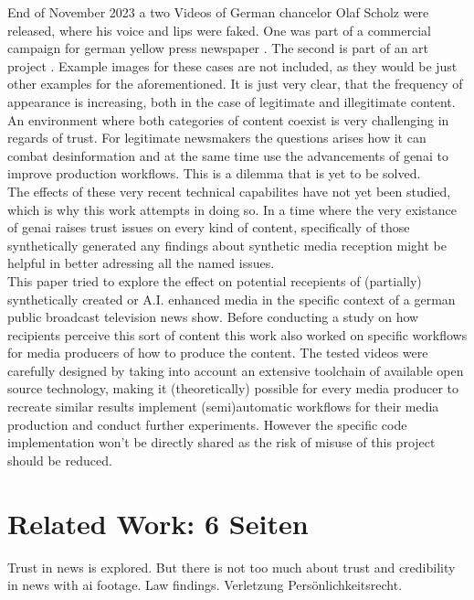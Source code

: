 \documentclass[
  a4paper,  %
  twoside,  %
  bibliography=totoc,
  headsepline,
  cleardoublepage=empty,
  parskip=half,
  draft=false
]{scrbook}
\begin{document}
End of November 2023 a two Videos of German chancelor Olaf Scholz were released, where his voice and lips were faked. One was part of a commercial campaign for german yellow press newspaper \cite{dwdl.deSpringerTrommeltMit}. The second is part of an art project \cite{zdfKunstinstallationDeepfakeScholzVerkuendet}. Example images for these cases are not included, as they would be just other examples for the aforementioned. It is just very clear, that the frequency of appearance is increasing, both in the case of legitimate and illegitimate content.
An environment where both categories of content coexist is very challenging in regards of trust. For legitimate newsmakers the questions arises how it can combat desinformation and at the same time use the advancements of \gls{genai} to improve production workflows. This is a dilemma that is yet to be solved. \\
The effects of these very recent technical capabilites have not yet been studied, which is why this work attempts in doing so. In a time where the very existance of \gls{genai} raises trust issues on every kind of content, specifically of those synthetically generated any findings about synthetic media reception might be helpful in better adressing all the named issues.\\
This paper tried to explore the effect on potential recepients of (partially) synthetically created or A.I. enhanced media in the specific context of a german public broadcast television news show. Before conducting a study on how recipients perceive this sort of content this work also worked on specific workflows for media producers of how to produce the content.
The tested videos were carefully designed by taking into account an extensive toolchain of available open source technology, making it (theoretically) possible for every media producer to recreate similar results implement (semi)automatic workflows for their media production and conduct further experiments. However the specific code implementation won't be directly shared as the risk of misuse of this project should be reduced. \\

\chapter{Related Work: 6 Seiten}
Trust in news is explored. 
But there is not too much about trust and credibility in news with ai footage.
Law findings. 
Verletzung Persönlichkeitsrecht.
\end{document}
